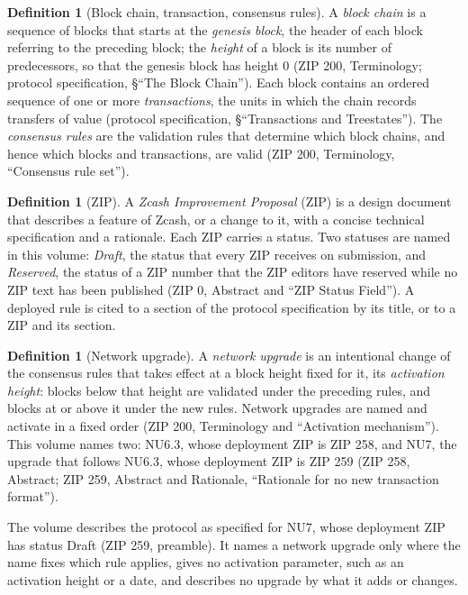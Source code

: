 \documentclass[11pt,a4paper]{article}
\theoremstyle{definition}
\newtheorem{definition}[theorem]{Definition}
\begin{document}
\begin{definition}[Block chain, transaction, consensus rules]
A \emph{block chain} is a sequence of blocks that starts at the \emph{genesis
block}, the header of each block referring to the preceding block; the
\emph{height} of a block is its number of predecessors, so that the genesis
block has height $0$ (ZIP 200, Terminology; protocol specification, \S``The
Block Chain''). Each block contains an ordered sequence of one or more
\emph{transactions}, the units in which the chain records transfers of value
(protocol specification, \S``Transactions and Treestates''). The
\emph{consensus rules} are the validation rules that determine which block
chains, and hence which blocks and transactions, are valid (ZIP 200,
Terminology, ``Consensus rule set'').
\end{definition}

\begin{definition}[ZIP]
A \emph{Zcash Improvement Proposal} (ZIP) is a design document that
describes a feature of Zcash, or a change to it, with a concise technical
specification and a rationale. Each ZIP carries a status. Two statuses are
named in this volume: \emph{Draft}, the status that every ZIP receives on
submission, and \emph{Reserved}, the status of a ZIP number that the ZIP
editors have reserved while no ZIP text has been published (ZIP 0, Abstract
and ``ZIP Status Field''). A deployed rule is cited to a section of the
protocol specification by its title, or to a ZIP and its section.
\end{definition}

\begin{definition}[Network upgrade]
A \emph{network upgrade} is an intentional change of the consensus rules
that takes effect at a block height fixed for it, its \emph{activation
height}: blocks below that height are validated under the preceding rules,
and blocks at or above it under the new rules. Network upgrades are named and
activate in a fixed order (ZIP 200, Terminology and ``Activation
mechanism''). This volume names two: NU6.3, whose deployment ZIP is ZIP 258,
and NU7, the upgrade that follows NU6.3, whose deployment ZIP is ZIP 259
(ZIP 258, Abstract; ZIP 259, Abstract and Rationale, ``Rationale for no new
transaction format'').
\end{definition}

The volume describes the protocol as specified for NU7, whose deployment ZIP
has status Draft (ZIP 259, preamble). It names a network upgrade only where
the name fixes which rule applies, gives no activation parameter, such as an
activation height or a date, and describes no upgrade by what it adds or
changes.
\end{document}
